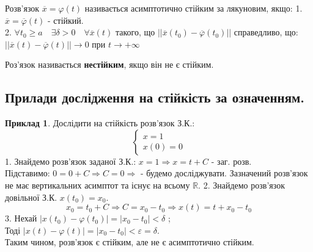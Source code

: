 \documentclass[14pt,a4paper]{scrartcl}
\theoremstyle{definition}
\newtheorem*{example}{Приклад}
\theoremstyle{remark}
\theoremstyle{definition}
\theoremstyle{definition}
\begin{document}
\bd
Розв'язок $ \overline{x} = \varphi(t) $ називається асимптотично стійким за лякуновим, якщо:
1. $ \overline{x} = \overline{\varphi} (t)$ - стійкий.\\
2. $\forall t_0 \geq a \quad \exists \delta > 0 \quad \forall \overline{x} (t) $ такого, що $ \left|
\left|  \overline{x} (t_0) - \overline{\varphi} (t_0) \right|
 \right| $ справедливо, що: \\ $  \left|
 \left|  \overline{x} (t) - \overline{\varphi} (t) \right|
  \right| \to 0   $ при $ t \to + \infty$
\ed

\def\vx{\overline{x}}
\def\vphi{\overline{\varphi}}
\def\vf{\overline{f}}

\bd
Роз'язок називається \textbf{нестійким}, якщо він не є стійким.
\ed

\subsection{Прилади дослідження на стійкість за означенням.}

\begin{example}
    Дослідити на стійкість розв'язок З.К.:
$$
\begin{cases}
    x = 1 \\
    x(0) = 0
\end{cases}
$$
1. Знайдемо розв'язок заданої З.К.: $x = 1 \Rightarrow x = t + C$ - заг. розв.\\
Підставимо: $ 0 = 0 + C \Longrightarrow C = 0 \Longrightarrow $  - будемо досліджувати.
Зазначений розв'язок не має вертикальних асимптот та існує на всьому $\mathbb{R}$.
2. Знайдемо розв'язок довільної З.К. $x(t_0) = x_0$.
$$
x_0 = t_0 + C \Rightarrow C = x_0 - t_0 \Rightarrow x(t) = t + x_0 - t_0
$$
3. Нехай $  \left| x(t_0) - \varphi(t_0) \right|  =  \left| x_0 - t_0 \right| < \delta  $ ;\\
Тоді $ \left| x (t) - \varphi (t) \right|  = \left|  x_0 - t_0 \right| < \varepsilon = \delta $.\\
Таким чином, розв'язок є стійким, але не є асимптотично стійким.

\end{example}
\end{document}
